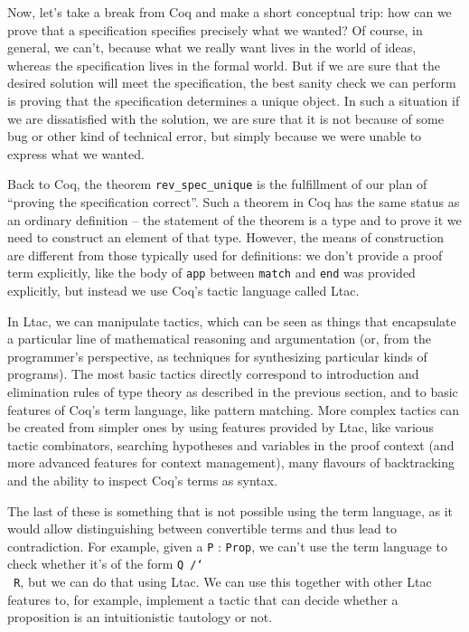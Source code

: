 \documentclass[declaration,mgr,english,shortabstract]{iithesis}
\newcommand{\m}[1]{\texttt{#1}}
\begin{document}
Now, let's take a break from Coq and make a short conceptual trip: how can we prove that a specification specifies precisely what we wanted? Of course, in general, we can't, because what we really want lives in the world of ideas, whereas the specification lives in the formal world. But if we are sure that the desired solution will meet the specification, the best sanity check we can perform is proving that the specification determines a unique object.
In such a situation if we are dissatisfied with the solution, we are sure that it is not because of some bug or other kind of technical error, but simply because we were unable to express what we wanted.

Back to Coq, the theorem \m{rev\_spec\_unique} is the fulfillment of our plan of ``proving the specification correct''. Such a theorem in Coq has the same status as an ordinary definition -- the statement of the theorem is a type and to prove it we need to construct an element of that type. However, the means of construction are different from those typically used for definitions: we don't provide a proof term explicitly, like the body of \m{app} between \m{match} and \m{end} was provided explicitly, but instead we use Coq's tactic language called Ltac.

In Ltac, we can manipulate tactics, which can be seen as things that encapsulate a particular line of mathematical reasoning and argumentation (or, from the programmer's perspective, as techniques for synthesizing particular kinds of programs). The most basic tactics directly correspond to introduction and elimination rules of type theory as described in the previous section, and to basic features of Coq's term language, like pattern matching. More complex tactics can be created from simpler ones by using features provided by Ltac, like various tactic combinators, searching hypotheses and variables in the proof context (and more advanced features for context management), many flavours of backtracking and the ability to inspect Coq's terms as syntax.

The last of these is something that is not possible using the term language, as it would allow distinguishing between convertible terms and thus lead to contradiction. For example, given a \m{P} : \m{Prop}, we can't use the term language to check whether it's of the form \m{Q /\char`\\\ R}, but we can do that using Ltac. We can use this together with other Ltac features to, for example, implement a tactic that can decide whether a proposition is an intuitionistic tautology or not.
\end{document}
